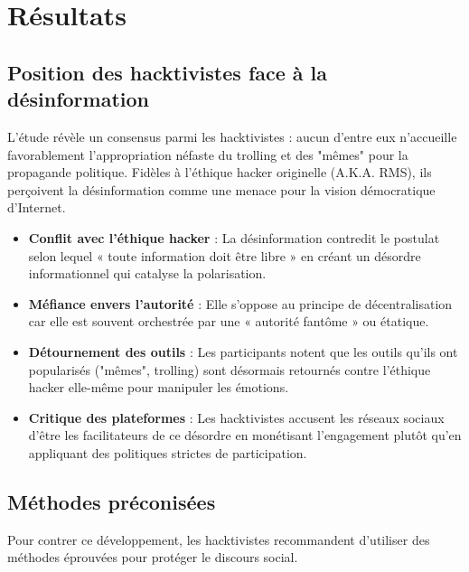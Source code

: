 \section{Résultats}

\subsection{Position des hacktivistes face à la désinformation}

L'étude révèle un consensus parmi les hacktivistes : aucun d'entre eux n'accueille favorablement l'appropriation néfaste du trolling et des "mêmes" pour la propagande politique. Fidèles à l'éthique hacker originelle (A.K.A. RMS), ils perçoivent la désinformation comme une menace pour la vision démocratique d'Internet.

\begin{itemize}
	\item \textbf{Conflit avec l'éthique hacker} : La désinformation contredit le postulat selon lequel « toute information doit être libre » en créant un désordre informationnel qui catalyse la polarisation.
	\item \textbf{Méfiance envers l'autorité} : Elle s'oppose au principe de décentralisation car elle est souvent orchestrée par une « autorité fantôme » ou étatique.
	\item \textbf{Détournement des outils} : Les participants notent que les outils qu'ils ont popularisés ("mêmes", trolling) sont désormais retournés contre l'éthique hacker elle-même pour manipuler les émotions.
	\item \textbf{Critique des plateformes} : Les hacktivistes accusent les réseaux sociaux d'être les facilitateurs de ce désordre en monétisant l'engagement plutôt qu'en appliquant des politiques strictes de participation.
\end{itemize}

\subsection{Méthodes préconisées}


Pour contrer ce développement, les hacktivistes recommandent d'utiliser des méthodes éprouvées pour protéger le discours social.

